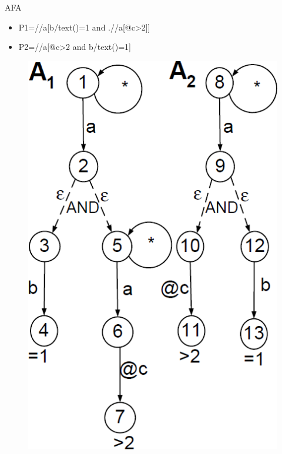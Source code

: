 \documentclass[mathserif,serif]{beamer}
\begin{document}
\begin{frame}{AFA}
  \begin{minipage}{0.63\textwidth}
    \begin{itemize}
      \item P1=//a[b/text()=1 and .//a[@c>2]]
      \item P2=//a[@c>2 and b/text()=1]
    \end{itemize}
  \end{minipage}
  \begin{minipage}{0.35\textwidth}
  \begin{figure}
    \centering
    \includegraphics[width=\textwidth]{AFA.png}
  \end{figure}
\end{minipage}
\end{frame}
\end{document}
